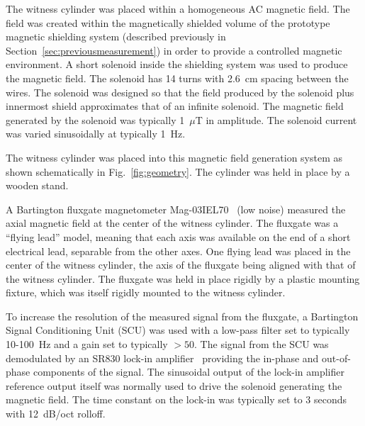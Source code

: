 The witness cylinder was placed within a homogeneous AC magnetic
field. The field was created within the magnetically shielded volume
of the prototype magnetic shielding system (described previously in
Section~\ref{sec:previousmeasurement}) in order to provide a
controlled magnetic environment.  A short solenoid inside the
shielding system was used to produce the magnetic field. The solenoid
has 14 turns with 2.6~cm spacing between the wires.  The solenoid was
designed so that the field produced by the solenoid plus innermost
shield approximates that of an infinite solenoid.  The magnetic field
generated by the solenoid was typically 1~$\mu$T in amplitude.  The
solenoid current was varied sinusoidally at typically 1~Hz.

The witness cylinder was placed into this magnetic field generation
system as shown schematically in Fig.~\ref{fig:geometry}. The
cylinder was held in place by a wooden stand.

A Bartington fluxgate magnetometer Mag-03IEL70~\cite{bartman} (low
noise) measured the axial magnetic field at the center of the witness
cylinder.  The fluxgate was a ``flying lead'' model, meaning that each
axis was available on the end of a short electrical lead, separable
from the other axes.  One flying lead was placed in the center of the
witness cylinder, the axis of the fluxgate being aligned with that of
the witness cylinder.  The fluxgate was held in place rigidly by a
plastic mounting fixture, which was itself rigidly mounted to the
witness cylinder.

To increase the resolution of the measured signal from the fluxgate, a
Bartington Signal Conditioning Unit (SCU) was used with a low-pass
filter set to typically 10-100~Hz and a gain set to typically $>50$.
The signal from the SCU was demodulated by an SR830 lock-in
amplifier~\cite{lockin} providing the in-phase and out-of-phase
components of the signal.  The sinusoidal output of the lock-in
amplifier reference output itself was normally used to drive the
solenoid generating the magnetic field.  The time constant on the
lock-in was typically set to 3 seconds with 12~dB/oct rolloff.

